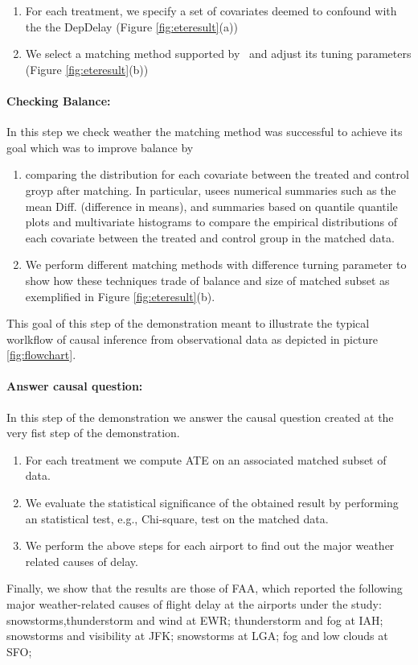      \begin{enumerate}
      \item For each treatment, we specify a set of covariates deemed to confound with the the DepDelay (Figure \ref{fig:eteresult}(a))
      \item We select a matching method supported by \GSQL\ and adjust its tuning parameters (Figure \ref{fig:eteresult}(b))
\end{enumerate}

\paragraph{\bf Checking Balance:}  In this step we check weather the matching method was successful to achieve its goal which was to improve balance by
    \begin{enumerate}
      \item comparing the distribution for each covariate between the treated and control groyp after matching. In particular, usees numerical summaries such as the mean Diff. (difference in means), and summaries based on quantile quantile plots and multivariate histograms to compare the empirical distributions of each covariate between the treated and control group in the matched data.

      \item We perform different matching methods with difference turning parameter to show how these techniques trade of balance and size of matched subset as exemplified in Figure \ref{fig:eteresult}(b).
       \end{enumerate}
      This goal of this step of the demonstration meant to illustrate the typical worlkflow of causal inference from observational data as depicted in picture \ref{fig:flowchart}.

     \paragraph{\bf Answer causal question:} In this step of the demonstration we answer the causal question created at the very fist step of the demonstration.

       \begin{enumerate}
       \item For each treatment we compute ATE on an associated matched subset of data.
      \item We evaluate the statistical significance of the obtained result by performing an statistical test, e.g., Chi-square, test on the matched data.
    \item We perform the above steps for each airport to find out the major weather related causes of delay.  
    \end{enumerate}

Finally, we show that the results are those of
FAA, which reported the following major weather-related
causes of flight delay at the airports under the study:
snowstorms,thunderstorm and wind at EWR; thunderstorm and fog at IAH;
snowstorms and visibility at JFK; snowstorms at LGA; fog and low
clouds at SFO;




